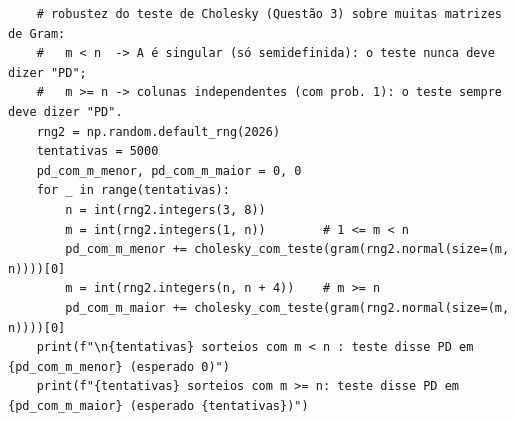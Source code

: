 \documentclass{article}
\theoremstyle{remark}
\begin{document}
\begin{lstlisting}
    # robustez do teste de Cholesky (Questão 3) sobre muitas matrizes de Gram:
    #   m < n  -> A é singular (só semidefinida): o teste nunca deve dizer "PD";
    #   m >= n -> colunas independentes (com prob. 1): o teste sempre deve dizer "PD".
    rng2 = np.random.default_rng(2026)
    tentativas = 5000
    pd_com_m_menor, pd_com_m_maior = 0, 0
    for _ in range(tentativas):
        n = int(rng2.integers(3, 8))
        m = int(rng2.integers(1, n))        # 1 <= m < n
        pd_com_m_menor += cholesky_com_teste(gram(rng2.normal(size=(m, n))))[0]
        m = int(rng2.integers(n, n + 4))    # m >= n
        pd_com_m_maior += cholesky_com_teste(gram(rng2.normal(size=(m, n))))[0]
    print(f"\n{tentativas} sorteios com m < n : teste disse PD em {pd_com_m_menor} (esperado 0)")
    print(f"{tentativas} sorteios com m >= n: teste disse PD em {pd_com_m_maior} (esperado {tentativas})")
\end{lstlisting}
\end{document}
